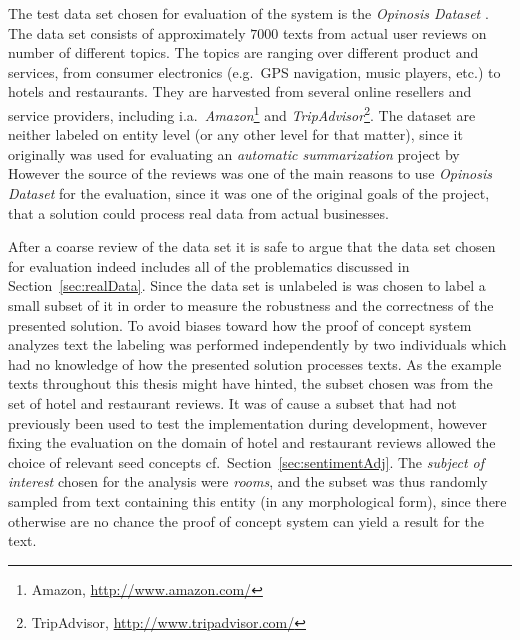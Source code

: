 The test data set chosen for evaluation of the system is the \emph{Opinosis Dataset} \cite{Opinosis}. The data set consists of  approximately $\num{7000}$ texts from actual user reviews on number of different topics. The topics are ranging over different product and services, from consumer electronics (e.g.\ GPS navigation, music players, etc.) to hotels and restaurants. They are harvested from several online resellers and service providers, including i.a.\ \emph{Amazon}\footnote{Amazon, \url{http://www.amazon.com/}} and \emph{TripAdvisor}\footnote{TripAdvisor, \url{http://www.tripadvisor.com/}}. The dataset are neither labeled on entity level (or any other level for that matter), since it originally was used for evaluating an \emph{automatic summarization} project by \citeauthor{Opinosis} However the source of the reviews was one of the main reasons to use \emph{Opinosis Dataset} for the evaluation, since it was one of the original goals of the project, that a solution could process real data from actual businesses.

After a coarse review of the data set it is safe to argue that the data set chosen for evaluation indeed includes all of the problematics discussed in Section~\vref{sec:realData}. Since the data set is unlabeled is was chosen to label a small subset of it in order to measure the robustness and the correctness of the presented solution. To avoid biases toward how the proof of concept system analyzes text the labeling was performed independently by two individuals which had no knowledge of how the presented solution processes texts. As the example texts throughout this thesis might have hinted, the subset chosen was from the set of hotel and restaurant reviews. It was of cause a subset that had not previously been used to test the implementation during development, however fixing the evaluation on the domain of hotel and restaurant reviews allowed the choice of relevant seed concepts cf.\ Section~\ref{sec:sentimentAdj}. The \emph{subject of interest} chosen for the analysis were \emph{rooms}, and the subset was thus randomly sampled from text containing this entity (in any morphological form), since there otherwise are no chance the proof of concept system can yield a result for the text.

